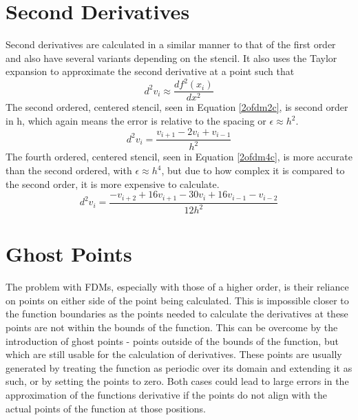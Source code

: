 \section{Second Derivatives}
Second derivatives are calculated in a similar manner to that of the first order and also have several variants depending on the stencil. It also uses the Taylor expansion to approximate the second derivative at a point such that 
\begin{equation}
d^2v_i \approx \frac{df^2(x_i)}{dx^2}
\end{equation}
The second ordered, centered stencil, seen in Equation \ref{2ofdm2c}, is second order in h, which again means the error is relative to the spacing or $\epsilon \approx h^2$.
\begin{equation} \label{2ofdm2c}
  d^2v_i = \frac{v_{i+1} - 2v_i + v_{i-1}}{h^2}
\end{equation}
The fourth ordered, centered stencil, seen in Equation \ref{2ofdm4c}, is more accurate than the second ordered, with $\epsilon \approx h^4$, but due to how complex it is compared to the second order, it is more expensive to calculate.
\begin{equation} \label{2ofdm4c}
  d^2v_i = \frac{-v_{i+2} + 16v_{i+1} - 30v_i + 16v_{i-1} - v_{i-2}}{12h^2}
\end{equation}
\section{Ghost Points}
The problem with FDMs, especially with those of a higher order, is their reliance on points on either side of the point being calculated. This is impossible closer to the function boundaries as the points needed to calculate the derivatives at these points are not within the bounds of the function. This can be overcome by the introduction of ghost points - points outside of the bounds of the function, but which are still usable for the calculation of derivatives. These points are usually generated by treating the function as periodic over its domain and extending it as such, or by setting the points to zero. Both cases could lead to large errors in the approximation of the functions derivative if the points do not align with the actual points of the function at those positions.